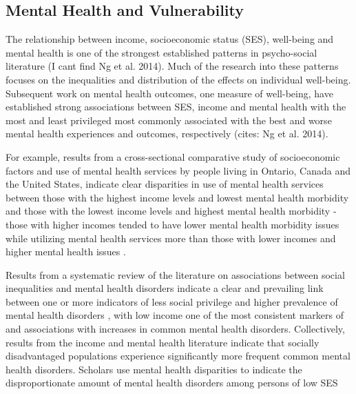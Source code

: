 \documentclass{article}
\begin{document}
\subsection{Mental Health and Vulnerability}



The relationship between income, socioeconomic status (SES), well-being and mental health is one of the strongest established patterns in psycho-social literature \citep{Easterlin1974Jan, holzer1986increased, Perry1996Sep} (I cant find Ng et al. 2014). Much of the research into these patterns focuses on the inequalities and distribution of the effects on individual well-being. Subsequent work on mental health outcomes, one measure of well-being, have established strong associations between SES, income and mental health with the most and least privileged most commonly associated with the best and worse mental health experiences and outcomes, respectively \citep{Sevenson2008Aug}(cites: Ng et al. 2014). 

For example, results from a cross-sectional comparative study of socioeconomic factors and use of mental health services by people living in Ontario, Canada and the United States, indicate clear disparities in use of mental health services between those with the highest income levels and lowest mental health morbidity and those with the lowest income levels and highest mental health morbidity - those with higher incomes tended to have lower mental health morbidity issues while utilizing mental health services more than those with lower incomes and higher mental health issues \citep{Katz1997}. 

Results from a systematic review of the literature on associations between social inequalities and mental health disorders indicate a clear and prevailing link between  one or more indicators of less social privilege and higher prevalence of mental health disorders \citep{Fryers2003}, with low income one of the most consistent markers of and associations with increases in common mental health disorders. Collectively, results from the income and mental health literature indicate that socially disadvantaged populations experience significantly more frequent common mental health disorders. Scholars use mental health disparities to indicate the disproportionate amount of mental health disorders among persons of low SES \citep{RN1292}
\end{document}

